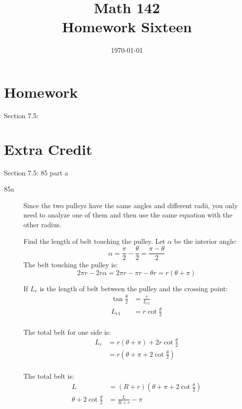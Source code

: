 \documentclass{exam}
\author{}
\date{\today}
\title{Math 142 \\ Homework Sixteen}
\begin{document}
  \maketitle

  \section{Homework}
  Section 7.5:

  \section{Extra Credit}
  Section 7.5: 85 part a

  \ifprintanswers
    \begin{description}
      \item[85a]
        Since the two pulleys have the same angles and different radii, you only need to analyze one of them and then
        use the same equation with the other radius.

        Find the length of belt touching the pulley.  Let $\alpha$ be the interior angle:
        \[
          \alpha = \frac{\pi}{2} - \frac{\theta}{2} = \frac{\pi - \theta}{2}
        \]
        The belt touching the pulley is:
        \[
          2 \pi r - 2r \alpha = 2 \pi r - \pi r - \theta r = r (\theta + \pi)
        \]

        If $L_r$ is the length of belt between the pulley and the crossing point:
        \begin{align*}
          \tan \frac{\theta}{2} & = \frac{r}{L_{r1}} \\
          L_{r1}                & = r \cot \frac{\theta}{2} \\
        \end{align*}

        The total belt for one side is:
        \begin{align*}
          L_r & = r (\theta + \pi) + 2 r \cot \frac{\theta}{2} \\
              & = r \left( \theta + \pi + 2 \cot \frac{\theta}{2} \right) \\
        \end{align*}

        The total belt is:
        \begin{align*}
          L                                 & = (R + r) \left( \theta + \pi + 2 \cot \frac{\theta}{2} \right) \\
          \theta  + 2 \cot \frac{\theta}{2} & = \frac{L}{R + r} - \pi \\
        \end{align*}

    \end{description}
\end{document}
